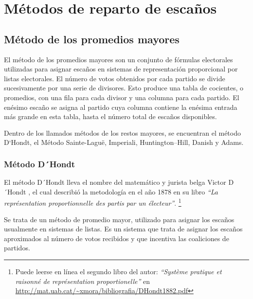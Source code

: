 \documentclass[12pt,a4paper,]{book}
\let\rmarkdownfootnote\footnote%
\def\footnote{\protect\rmarkdownfootnote}
\numberwithin{dummy}{section}
\theoremstyle{ocrenumbox}
\theoremstyle{blacknumex}
\theoremstyle{blacknumbox}
\theoremstyle{ocrenum}
\theoremstyle{ocrenum}
\begin{document}
\hypertarget{muxe9todos-de-reparto-de-escauxf1os}{%
\chapter{Métodos de reparto de
escaños}\label{muxe9todos-de-reparto-de-escauxf1os}}

\hypertarget{muxe9todo-de-los-promedios-mayores}{%
\section{Método de los promedios
mayores}\label{muxe9todo-de-los-promedios-mayores}}

El método de los promedios mayores son un conjunto de fórmulas
electorales utilizadas para asignar escaños en sistemas de
representación proporcional por listas electorales. El número de votos
obtenidos por cada partido se divide sucesivamente por una serie de
divisores. Esto produce una tabla de cocientes, o promedios, con una
fila para cada divisor y una columna para cada partido. El enésimo
escaño se asigna al partido cuya columna contiene la enésima entrada más
grande en esta tabla, hasta el número total de escaños disponibles.

Dentro de los llamados métodos de los restos mayores, se encuentran el
método D`Hondt, el Método Sainte-Laguë, Imperiali, Huntington--Hill,
Danish y Adams.

\hypertarget{muxe9todo-dhondt}{%
\subsection{Método D´Hondt}\label{muxe9todo-dhondt}}

El método D´Hondt lleva el nombre del matemático y jurista belga Victor
D´Hondt , el cual describió la metodología en el año 1878 en su libro
\emph{``La représentation proportionnelle des partis par un électeur''}.
\footnote{Puede leerse en línea el segundo libro del autor:
  \emph{``Système pratique et raisonné de représentation
  proportionelle''} en
  \url{http://mat.uab.cat/~xmora/bibliografia/DHondt1882.pdf}}

Se trata de un método de promedio mayor, utilizado para asignar los
escaños usualmente en sistemas de listas. Es un sistema que trata de
asignar los escaños aproximados al número de votos recibidos y que
incentiva las coaliciones de partidos.
\end{document}
